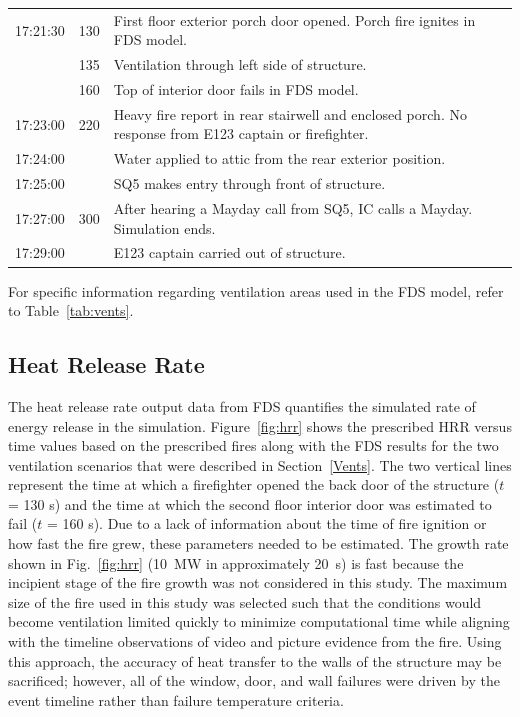 \begin{table}
\begin{tabular}{ccl}
\multirow{2}{*}{17:21:30} & \multirow{2}{*}{130} &  \multirow{2}{*}{\parbox{8cm}{First floor exterior porch door opened. Porch fire ignites in FDS model.}} \\
        &  & \\[.25cm]
        & 135 & Ventilation through left side of structure. \\[.25cm] 
        & 160 & Top of interior door fails in FDS model. \\[.25cm] 
\multirow{3}{*}{17:23:00}    & \multirow{3}{*}{220} & \multirow{3}{*}{\parbox{8cm} {Heavy fire report in rear stairwell and enclosed porch. No response from E123 captain or firefighter.}} \\
         & & \\[.25cm]
         & & \\[.25cm]  
17:24:00    &   & Water applied to attic from the rear exterior position. \\[.25cm]
17:25:00    &   & SQ5 makes entry through front of structure. \\[.25cm]
\multirow{2}{*}{17:27:00}    & \multirow{2}{*}{300}  & \multirow{2}{*}{\parbox{8cm} {After hearing a Mayday call from SQ5, IC calls a Mayday. Simulation ends.}}\\
         & &  \\[.25cm]
17:29:00    &   & E123 captain carried out of structure. \\
\bottomrule[1.25pt]
\end{tabular}\par
\footnotesize
For specific information regarding ventilation areas used in the FDS model, refer to Table~\ref{tab:vents}.
\normalsize
\end{table}


\subsection{Heat Release Rate}
\label{HRR}
The heat release rate output data from FDS quantifies the simulated rate of energy release in the simulation. Figure~\ref{fig:hrr} shows the prescribed HRR versus time values based on the prescribed fires along with the FDS results for the two ventilation scenarios that were described in Section~\ref{Vents}. The two vertical lines represent the time at which a firefighter opened the back door of the structure ($t$ = 130 s) and the time at which the second floor interior door was estimated to fail ($t$ = 160 s). Due to a lack of information about the time of fire ignition or how fast the fire grew, these parameters needed to be estimated.  The growth rate shown in Fig.~\ref{fig:hrr} (10~MW in approximately 20~s) is fast because the incipient stage of the fire growth was not considered in this study. The maximum size of the fire used in this study was selected such that the conditions would become ventilation limited quickly to minimize computational time while aligning with the timeline observations of video and picture evidence from the fire. Using this approach, the accuracy of heat transfer to the walls of the structure may be sacrificed; however, all of the window, door, and wall failures were driven by the event timeline rather than failure temperature criteria.

